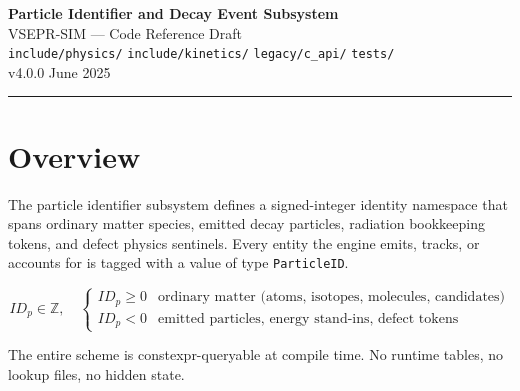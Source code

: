 \documentclass[11pt,a4paper]{article}
\begin{document}
\begin{center}
  {\LARGE\bfseries Particle Identifier and Decay Event Subsystem}\\[4pt]
  {\large VSEPR-SIM --- Code Reference Draft}\\[2pt]
  {\small\texttt{include/physics/} \quad \texttt{include/kinetics/} \quad
         \texttt{legacy/c\_api/} \quad \texttt{tests/}}\\[6pt]
  {\small v4.0.0 \quad June 2025}
\end{center}

\vspace{6pt}
\hrule
\vspace{10pt}

\tableofcontents
\newpage

\section{Overview}

The particle identifier subsystem defines a signed-integer identity
namespace that spans ordinary matter species, emitted decay particles,
radiation bookkeeping tokens, and defect physics sentinels.  Every entity
the engine emits, tracks, or accounts for is tagged with a value of type
\texttt{ParticleID}.

\[
ID_p \in \mathbb{Z}, \quad
\begin{cases}
ID_p \ge 0 & \text{ordinary matter (atoms, isotopes, molecules, candidates)} \\
ID_p  <  0 & \text{emitted particles, energy stand-ins, defect tokens}
\end{cases}
\]

The entire scheme is constexpr-queryable at compile time.  No runtime
tables, no lookup files, no hidden state.
\end{document}
